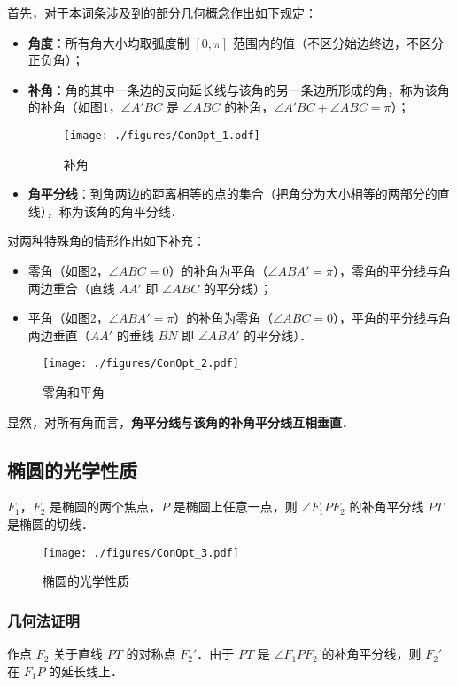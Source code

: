 

首先，对于本词条涉及到的部分几何概念作出如下规定：
\begin{itemize}
\item \textbf{角度}：所有角大小均取弧度制 $[0,\pi]$ 范围内的值（不区分始边终边，不区分正负角）；
\item \textbf{补角}：角的其中一条边的反向延长线与该角的另一条边所形成的角，称为该角的补角（如图1，$\angle A'BC$ 是 $\angle ABC$ 的补角，$\angle A'BC + \angle ABC = \pi$）；
\begin{figure}[ht]
\centering
\texttt{[image: ./figures/ConOpt\_1.pdf]}
\caption{补角} \label{ConOpt_fig1}
\end{figure}
\item \textbf{角平分线}：到角两边的距离相等的点的集合（把角分为大小相等的两部分的直线），称为该角的角平分线．
\end{itemize}
对两种特殊角的情形作出如下补充：
\begin{itemize}
\item 零角（如图2，$\angle ABC = 0$）的补角为平角（$\angle ABA' = \pi$），零角的平分线与角两边重合（直线 $AA'$ 即 $\angle ABC$ 的平分线）；
\item 平角（如图2，$\angle ABA' = \pi$）的补角为零角（$\angle ABC = 0$），平角的平分线与角两边垂直（$AA'$ 的垂线 $BN$ 即 $\angle ABA'$ 的平分线）．
\end{itemize}
\begin{figure}[ht]
\centering
\texttt{[image: ./figures/ConOpt\_2.pdf]}
\caption{零角和平角} \label{ConOpt_fig2}
\end{figure}
显然，对所有角而言，\textbf{角平分线与该角的补角平分线互相垂直}．

\subsection{椭圆的光学性质}
$F_1$，$F_2$ 是椭圆的两个焦点，$ P $ 是椭圆上任意一点，则 $\angle F_1PF_2 $ 的补角平分线 $ PT $ 是椭圆的切线．
\begin{figure}[ht]
\centering
\texttt{[image: ./figures/ConOpt\_3.pdf]}
\caption{椭圆的光学性质} \label{ConOpt_fig3}
\end{figure}
\subsubsection{几何法证明}
作点 $F_2$ 关于直线 $PT$ 的对称点 $F_2'$．由于 $PT$ 是 $\angle F_1PF_2 $ 的补角平分线，则 $F_2'$ 在 $F_1P$ 的延长线上．

